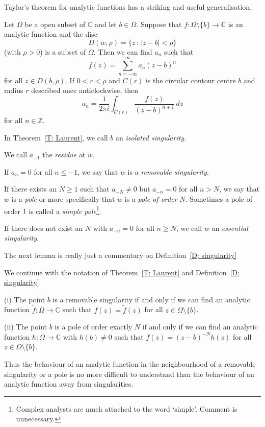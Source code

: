 Taylor's theorem for analytic functions has a striking
and useful generalisation.
\begin{theorem}\label{T; Laurent}
Let $\Omega$ be a open subset of ${\mathbb C}$
and let $b\in{\Omega}$.
Suppose that $f:{\Omega}\setminus\{b\}
\rightarrow{\mathbb C}$ is an analytic
function and the disc
\[D(w,\rho)=\{z\,:\,|z-b|<\rho\}\]
(with $\rho>0$) is a subset of $\Omega$.
Then we can find $a_{n}$ such that
\[f(z)=\sum_{n=-\infty}^{\infty}a_{n}(z-b)^{n}\]
for all $z\in D(b,\rho)$.
If $0<r<\rho$ and $C(r)$ is the circular contour centre $b$
and radius $r$ described once anticlockwise, then
\[a_{n}=\frac{1}{2\pi i}\int_{C(r)}\frac{f(z)}{(z-b)^{n+1}}\,dz\]
for all $n\in{\mathbb Z}$.
\end{theorem}

\begin{definition}\label{D; singularity} 
In Theorem~\ref{T; Laurent},
we call $b$ an \emph{isolated singularity}.

We call $a_{-1}$ the \emph{residue} at $w$.

If $a_{n}=0$ for all $n\leq -1$, we say that
$w$ is a \emph{removable singularity}.

If there exists an $N\geq 1$ such that $a_{-N}\neq 0$
but $a_{-n}=0$ for all $n>N$, we say that
$w$ is a \emph{pole} or more specifically
that $w$ is a \emph{pole of order} $N$.
Sometimes a pole of order $1$ is called a 
\emph{simple pole}\footnote{Complex analysts are much
attached to the word `simple'. Comment is unnecessary.}.

If there does not exist an $N$ with
$a_{-n}=0$ for all $n\geq N$, we call $w$
an \emph{essential singularity}.
\end{definition}

The next lemma is really just a commentary on
Definition~\ref{D; singularity}
\begin{lemma} We continue with the notation
of Theorem~\ref{T; Laurent} and Definition~\ref{D; singularity}.

(i) The point $b$ is a removable singularity if and
only if we can find
an analytic function 
$\tilde{f}:\Omega\rightarrow{\mathbb C}$
such that $f(z)=\tilde{f}(z)$ for all $z\in\Omega\setminus\{b\}$.

(ii) The point $b$ is a pole of order exactly $N$ if and
only if we can find
an analytic function $h:\Omega\rightarrow{\mathbb C}$
with $h(b)\neq 0$
such that $f(z)=(z-b)^{-N}h(z)$  
for all $z\in\Omega\setminus\{b\}$.
\end{lemma}
Thus the behaviour of an analytic function in
the neighbourhood of a removable singularity
or a pole is no more difficult to understand
than the behaviour of an analytic function 
away from singularities.

